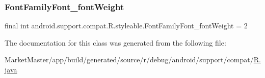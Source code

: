\subsubsection{\texorpdfstring{Font\+Family\+Font\+\_\+font\+Weight}{FontFamilyFont\_fontWeight}}
{\footnotesize\ttfamily final int android.\+support.\+compat.\+R.\+styleable.\+Font\+Family\+Font\+\_\+font\+Weight = 2\hspace{0.3cm}{\ttfamily [static]}}



The documentation for this class was generated from the following file\+:\begin{DoxyCompactItemize}
\item 
Market\+Master/app/build/generated/source/r/debug/android/support/compat/\mbox{\hyperlink{debug_2android_2support_2compat_2R_8java}{R.\+java}}\end{DoxyCompactItemize}
